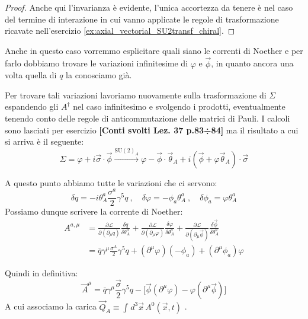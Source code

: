 \documentclass[../main.tex]{subfiles}
\begin{document}
\begin{enumerate}
    \begin{proof}
        Anche qui l'invarianza è evidente, l'unica accortezza da tenere è nel caso del termine di interazione in cui vanno applicate le regole di trasformazione ricavate nell'esercizio \ref{ex:axial_vectorial_SU2transf_chiral}.
    \end{proof}

    Anche in questo caso vorremmo esplicitare quali siano le correnti di Noether e per farlo dobbiamo trovare le variazioni infinitesime di $\varphi$ e $\Vec{\phi}$, in quanto ancora una volta quella di $q$ la conosciamo già. 

    Per trovare tali variazioni lavoriamo nuovamente sulla trasformazione di $\Sigma$ espandendo gli $A^\dagger$ nel caso infinitesimo e svolgendo i prodotti, eventualmente tenendo conto delle regole di anticommutazione delle matrici di Pauli. I calcoli sono lasciati per esercizio \textbf{[Conti svolti Lez. 37 p.83÷84]} ma il risultato a cui si arriva è il seguente:
    \[
    \Sigma = \varphi +i\Vec\sigma\cdot\Vec\phi \xrightarrow{\text{SU}(2)_A} \varphi - \Vec\phi\cdot\Vec{\theta}_A +i(\Vec{\phi} +\varphi\Vec{\theta}_A)\cdot\Vec\sigma
    \]

    A questo punto abbiamo tutte le variazioni che ci servono:
    \begin{equation}
        \boxed{\delta q = -i\theta_A^a\frac{\sigma^a}{2}\gamma^5 q~,\quad
        \delta \varphi = - \phi_a\theta_A^a~,\quad
        \delta\phi_a = \varphi\theta^a_A}
        \label{eq:SU2_A_infinit_fields_variation}
    \end{equation}
    Possiamo dunque scrivere la corrente di Noether:
    \begin{align*}
        A^{a,\mu} &=\frac{\partial\mathscr{L}}{\partial(\partial_\mu q)}\frac{\delta q}{\delta\theta^a_A} + \frac{\partial\mathscr{L}}{\partial(\partial_\mu \varphi)}\frac{\delta \varphi}{\delta\theta^a_A} +\frac{\partial\mathscr{L}}{\partial(\partial_\mu\Vec{\phi})}\frac{\delta \Vec\phi}{\delta\theta^a_A}\\
        &= \bar q\gamma^\mu\frac{\sigma^A}{2}\gamma^5 q + (\partial^\mu\varphi)(-\phi_a) + (\partial^\mu\phi_a)\varphi
    \end{align*}

    Quindi in definitiva:
    \begin{equation}
        \boxed{\Vec{A}^{\mu} = \bar q\gamma^\mu\frac{\Vec{\sigma}}{2}\gamma^5 q - \big[\Vec{\phi}(\partial^\mu\varphi) - \varphi(\partial^\mu\Vec{\phi})\big]}
        \label{eq:SU2_A_noethercurrent}
    \end{equation}
    A cui associamo la carica \(\Vec{Q}_A \equiv \int_{}d^3\Vec{x}\, A^0(\Vec{x},t)\) .
\end{enumerate}
\end{document}
